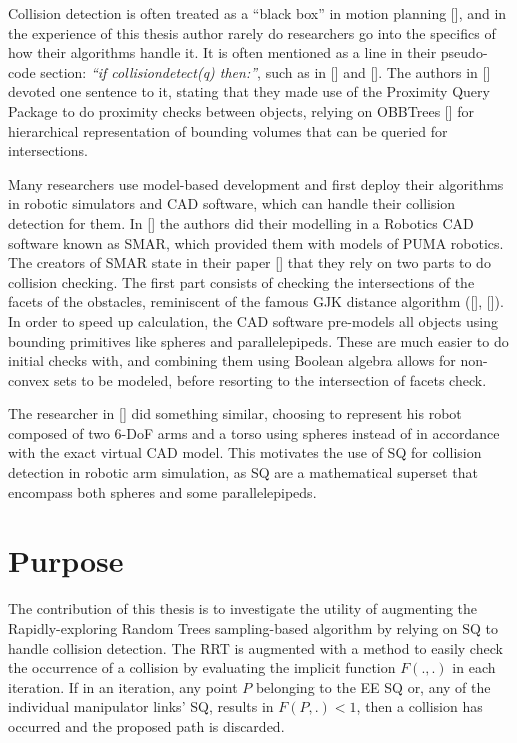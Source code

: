 Collision detection is often treated as a “black box” in motion planning [\citeauthor{LaValle2006}], and in the experience of this thesis author rarely do researchers go into the specifics of how their algorithms handle it. It is often mentioned as a line in their pseudo-code section: \textit{“if collisiondetect(q) then:”}, such as in [\citeauthor{Lee}] and [\citeauthor{Klanke2006}]. The authors in [\citeauthor{Hirano2005}] devoted one sentence to it, stating that they made use of the Proximity Query Package to do proximity checks between objects, relying on \gls{OBB}Trees [\citeauthor{Gottschalk1996}] for hierarchical representation of bounding volumes that can be queried for intersections. 

Many researchers use model-based development and first deploy their algorithms in robotic simulators and \gls{CAD} software, which can handle their collision detection for them. In [\citeauthor{Lahouar2006}] the authors did their modelling in a Robotics \gls{CAD} software known as SMAR, which provided them with models of PUMA robotics. The creators of SMAR state in their paper [\citeauthor{Zeghloul1997}] that they rely on two parts to do collision checking. The first part consists of checking the intersections of the facets of the obstacles, reminiscent of the famous \gls{GJK} distance algorithm ([\citeauthor{Gilbert1988}], [\citeauthor{Lindemann2009}]). In order to speed up calculation, the CAD software pre-models all objects using bounding primitives like spheres and parallelepipeds. These are much easier to do initial checks with, and combining them using Boolean algebra allows for non-convex sets to be modeled, before resorting to the intersection of facets check. 

The researcher in [\citeauthor{Park2015}] did something similar, choosing to represent his robot composed of two 6-DoF arms and a torso using spheres instead of in accordance with the exact virtual CAD model. This motivates the use of \gls{SQ} for collision detection in robotic arm simulation, as \gls{SQ} are a mathematical superset that encompass both spheres and some parallelepipeds. 

\section{Purpose}

The contribution of this thesis is to investigate the utility of augmenting the Rapidly-exploring Random Trees sampling-based algorithm by relying on \gls{SQ} to handle collision detection. The \gls{RRT} is augmented with a method to easily check the occurrence of a collision by evaluating the implicit function $F(.,.)$ in each iteration. If in an iteration, any point $P$ belonging to the \gls{EE} \gls{SQ} or, any of the individual manipulator links' \gls{SQ}, results in $F(P,.) < 1$, then a collision has occurred and the proposed path is discarded. 

